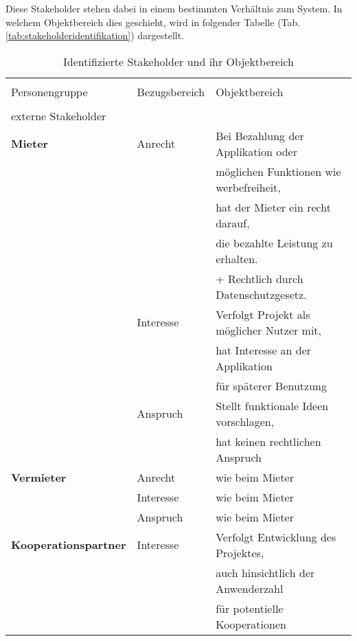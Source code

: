 Diese Stakeholder stehen dabei in einem bestimmten Verhältnis zum System. In welchem Objektbereich dies geschieht, wird in folgender Tabelle (Tab.\ref{tab:stakeholderidentifikation}) dargestellt.


\begin{table}[H]
\caption{Identifizierte Stakeholder und ihr Objektbereich}

\centering
\begin{tabular}{l l l}
\\ [-0.5ex]

\hline\hline
\\ [-0.5ex]
Personengruppe & Bezugsbereich & Objektbereich
\\ [1ex]
\hline
\\ [-0.5ex]
externe Stakeholder  & &\\[1ex]
\textbf{Mieter} & Anrecht & Bei Bezahlung der Applikation oder\\[0.5ex]
               & & möglichen Funktionen wie werbefreiheit,\\[0.5ex]
               & & hat der Mieter ein recht darauf,\\[0.5ex]
               & & die bezahlte Leistung zu erhalten. \\[0.5ex]
               & & + Rechtlich durch Datenschutzgesetz. \\[1ex]



      & Interesse & Verfolgt Projekt als möglicher Nutzer mit, \\[0.5ex]
                & & hat Interesse an der Applikation \\[0.5ex]
                & & für späterer Benutzung\\[1ex]

      & Anspruch  & Stellt funktionale Ideen vorschlagen, \\[0.5ex]
                & & hat keinen rechtlichen Anspruch\\[1ex]


\textbf{Vermieter} & Anrecht & wie beim Mieter \\[0.5ex]
          & Interesse & wie beim Mieter \\[0.5ex]
          & Anspruch & wie beim Mieter \\[1ex]

\textbf{Kooperationspartner} & Interesse & Verfolgt Entwicklung des Projektes,\\[0.5ex]
                               & & auch hinsichtlich der Anwenderzahl\\[0.5ex]
                               & & für potentielle Kooperationen\\[1ex]


\end{tabular}
\end{table}
